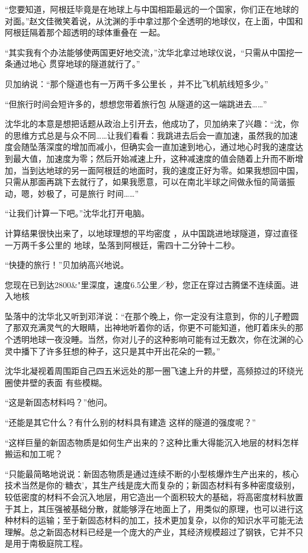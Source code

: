 \documentclass{article}
\begin{document}
“您要知道，阿根廷毕竟是在地球上与中国相距最远的一个国家，你们正在地球的对面。”赵文佳微笑着说，从沈渊的手中拿过那个全透明的地球仪，在上面，中国和阿根廷隔着那个超透明的球体重叠在
一起。 

“其实我有个办法能够使两国更好地交流，”沈华北拿过地球仪说，“只需从中国挖一条通过地心
贯穿地球的隧道就行了。” 

\newpage

贝加纳说：“那个隧道也有一万两千多公里长
，并不比飞机航线短多少。” 

“但旅行时间会短许多的，想想您带着旅行包
从隧道的这一端跳进去……” 

沈华北的本意是想把话题从政治上引开去，他成功了，贝加纳来了兴趣：“沈，你的思维方式总是与众不同……让我们看看：我跳进去后会一直加速，虽然我的加速度会随坠落深度的增加而减小，但确实会一直加速到地心，通过地心时我的速度达到最大值，加速度为零；然后开始减速上升，这种减速度的值会随着上升而不断增加，当到达地球的另一面阿根廷的地面时，我的速度正好为零。如果我想回中国，只需从那面再跳下去就行了，如果我愿意，可以在南北半球之间做永恒的简谐振动，嗯，妙极了，可是旅行
时间……” 


“让我们计算一下吧。”沈华北打开电脑。 

计算结果很快出来了，以地球理想的平均密度
\newpage
，从中国跳进地球隧道，穿过直径一万两千多公里的
地球，坠落到阿根廷，需四十二分钟十二秒。 


“快捷的旅行！”贝加纳高兴地说。 

您现在已到达2800&"里深度，速度6.5公里／秒，您正在穿过古腾堡不连续面。进入地核

坠落中的沈华北又听到邓洋说：“在那个晚上，你一定没有注意到，你的儿子瞪圆了那双充满灵气的大眼睛，出神地听着你的话，你更不可能知道，他盯着床头的那个透明地球一夜没睡。当然，你对儿子的这种影响可能有过无数次，你在沈渊的心灵中播下了许多狂想的种子，这只是其中开出花朵的一颗。”

沈华北凝视着周围距自己四五米远处的那一圈飞速上升的井壁，高频掠过的环绕光圈使井壁的表面
有些模糊。 


“这是新固态材料吗？”他问。 

\newpage

“还能是其它什么？有什么别的材料具有建造
这样的隧道的强度呢？” 

“这样巨量的新固态物质是如何生产出来的？这种比重大得能沉入地层的材料怎样搬运和加工呢？

“只能最简略地说说：新固态物质是通过连续不断的小型核爆炸生产出来的，核心技术当然是你的‘糖衣’，其生产线是庞大而复杂的；新固态材料有多种密度级别，较低密度的材料不会沉入地层，用它造出一个面积较大的基础，将高密度材料放置于其上，其压强被基础分散，就能够浮在地面上了，用类似的原理，也可以进行这种材料的运输；至于新固态材料的加工，技术更加复杂，以你的知识水平可能无法理解。总之新固态材料已经是一个庞大的产业，其经济规模超过了钢铁，它并不只是用于南极庭院工程。
\end{document}
